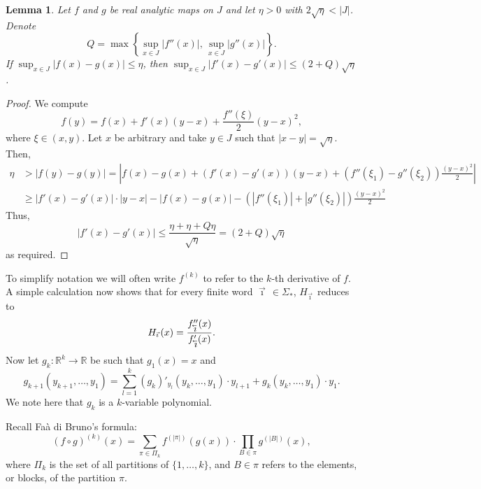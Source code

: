 \documentclass[12pt,]{article}
\newtheorem{lemma}[theorem]{Lemma}
\theoremstyle{definition}
\theoremstyle{remark}
\renewcommand{\Bbb}[1]{\mathbb{#1}}
\newcommand{\bbR}{{\Bbb R}}        %
\newcommand{\0}{\mathbf{0}}
\newcommand{\cev}[1]{\reflectbox{\ensuremath{\vec{\reflectbox{\ensuremath{#1}}}}}}
\newcommand{\bi}{\vec{\imath}\,}
\newcommand{\bbi}{\,\cev{\imath}}
\begin{document}
\begin{lemma}\label{thm:analyticity}
  Let $f$ and $g$ be real analytic maps on $J$
  and let $\eta>0$ with $2\sqrt{\eta}<|J|$.
  Denote
  \[
    Q = \max\left\{\sup_{x\in J} |f''(x)|,\, \sup_{x\in J}|g''(x)|\right\}.
  \]
  If $\sup_{x\in J} |f(x)-g(x)| \leq \eta$, then $\sup_{x\in J} |f'(x)-g'(x)|\leq (2+Q)\sqrt{\eta}$.
\end{lemma}
\begin{proof}
  We compute
  \[
    f(y) = f(x) + f'(x)(y-x)+ \frac{f''(\xi)}{2}(y-x)^2,
  \]
  where $\xi\in(x,y)$.
  Let $x$ be arbitrary and take $y\in J$ such that $|x-y|=\sqrt{\eta}$.
  Then,
  \begin{align*}
    \eta &> |f(y)-g(y)| =
    \left|f(x)-g(x)+(f'(x)-g'(x))(y-x)+(f''(\xi_1)-g''(\xi_2))\frac{(y-x)^2}{2}\right|\\
	 &\geq |f'(x)-g'(x)|\cdot|y-x|-|f(x)-g(x)|-(|f''(\xi_1)|+|g''(\xi_2)|)\frac{(y-x)^2}{2}
  \end{align*}
  Thus,
  \[
    |f'(x)-g'(x)| \leq \frac{\eta+\eta+Q \eta}{\sqrt{\eta}} = (2+Q)\sqrt{\eta}
  \]
  as required.
\end{proof}

To simplify notation we will often write $f^{(k)}$ to refer to the $k$-th derivative of $f$.
A simple calculation now shows that for every finite word $\bi\in\Sigma_*$, $H_{\bi}$ reduces to
\[
  H_{\bi}(x) = \frac{f''_{\bbi}(x)}{f'_{\bbi}(x)}.
\]
Now let $g_k:\bbR^k\to \bbR$ be such that $g_1(x)=x$ and
\[
  g_{k+1}(y_{k+1},\dots,y_1)=\sum_{l=1}^k (g_k)'_{y_l}(y_k,\dots,y_1)\cdot y_{l+1} +
  g_k(y_k,\dots,y_1)\cdot y_1.
\]
We note here that $g_k$ is a $k$-variable polynomial.

Recall Fa\`a di Bruno's formula:
\[
  (f\circ g)^{(k)}(x) = \sum_{\pi\in \Pi_k} f^{(|\pi|)}(g(x)) \cdot \prod_{B\in\pi}
  g^{(|B|)}(x),
\]
where $\Pi_k$ is the set of all partitions of $\{1,\dots,k\}$, and $B\in \pi$ refers to the
elements, or blocks, of the partition $\pi$.
\end{document}
